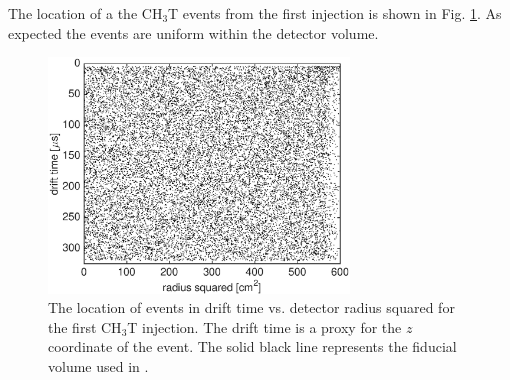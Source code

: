The location of a the CH$_3$T events from the first injection is shown in Fig. \ref{fig:event_location}. As expected the events are uniform within the detector volume.
 
\begin{figure}[h!]\centering
\includegraphics[width=80mm]{fig/rz_scatter.eps}
\caption{The location of events in drift time vs. detector radius squared for the first CH$_3$T injection. The drift time is a proxy for the $z$ coordinate of the event. The solid black line represents the fiducial volume used in \cite{luxresults}.}
\label{fig:event_location}
\end{figure}





